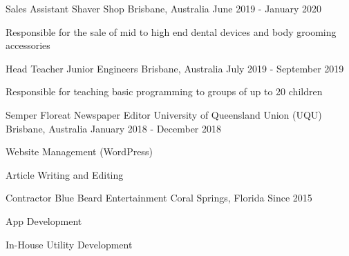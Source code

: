 


\begin{cventries}


\cventry
{Sales Assistant} %
{Shaver Shop} %
{Brisbane, Australia} %
{June 2019 - January 2020} %
{ %
\begin{cvitems}
\item {Responsible for the sale of mid to high end dental devices and body grooming accessories}
\end{cvitems}
}


\cventry
{Head Teacher} %
{Junior Engineers} %
{Brisbane, Australia} %
{July 2019 - September 2019} %
{ %
\begin{cvitems}
\item {Responsible for teaching basic programming to groups of up to 20 children}
\end{cvitems}
}


\cventry
{Semper Floreat Newspaper Editor} %
{University of Queensland Union (UQU)} %
{Brisbane, Australia} %
{January 2018 - December 2018} %
{ %
\begin{cvitems}
\item {Website Management (WordPress)}
\item {Article Writing and Editing}
\end{cvitems}
}


\cventry
{Contractor} %
{Blue Beard Entertainment} %
{Coral Springs, Florida} %
{Since 2015} %
{ %
\begin{cvitems}
\item {App Development}
\item {In-House Utility Development}
\end{cvitems}
}


\end{cventries}
